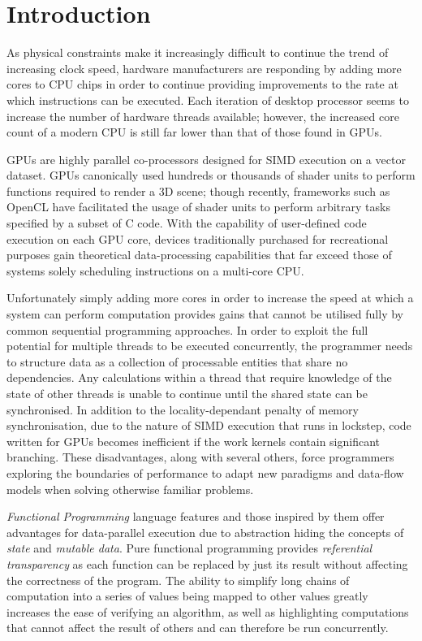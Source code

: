 \section{Introduction}
  As physical constraints make it increasingly difficult to continue the trend of increasing clock speed, hardware manufacturers are responding by adding more cores to \ac{CPU} chips in order to continue providing improvements to the rate at which instructions can be executed. Each iteration of desktop processor seems to increase the number of hardware threads available; however, the increased core count of a modern \ac{CPU} is still far lower than that of those found in \ac{GPUs}.

\ac{GPUs} are highly parallel co-processors designed for \ac{SIMD} execution on a vector dataset. \ac{GPUs} canonically used hundreds or thousands of shader units to perform functions required to render a 3D scene; though recently, frameworks such as \ac{OpenCL} have facilitated the usage of shader units to perform arbitrary tasks specified by a subset of C code.
 With the capability of user-defined code execution on each GPU core, devices traditionally purchased for recreational purposes gain theoretical data-processing capabilities that far exceed those of systems solely scheduling instructions on a multi-core \ac{CPU}.

Unfortunately simply adding more cores in order to increase the speed at which a system can perform computation provides gains that cannot be utilised fully by common sequential programming approaches. In order to exploit the full potential for multiple threads to be executed concurrently, the programmer needs to structure data as a collection of processable entities that share no dependencies. Any calculations within a thread that require knowledge of the state of other threads is unable to continue until the shared state can be synchronised. In addition to the locality-dependant penalty of memory synchronisation, due to the nature of \ac{SIMD} execution that runs in lockstep, code written for \ac{GPUs} becomes inefficient if the work kernels contain significant branching. These disadvantages, along with several others, force programmers exploring the boundaries of performance to adapt new paradigms and data-flow models when solving otherwise familiar problems.


\emph{Functional Programming} language features and those inspired by them offer advantages for data-parallel execution due to abstraction hiding the concepts of \emph{state} and \emph{mutable data}. Pure functional programming provides \emph{referential transparency} as each function can be replaced by just its result without affecting the correctness of the program. The ability to simplify long chains of computation into a series of values being mapped to other values greatly increases the ease of verifying an algorithm, as well as highlighting computations that cannot affect the result of others and can therefore be run concurrently.

